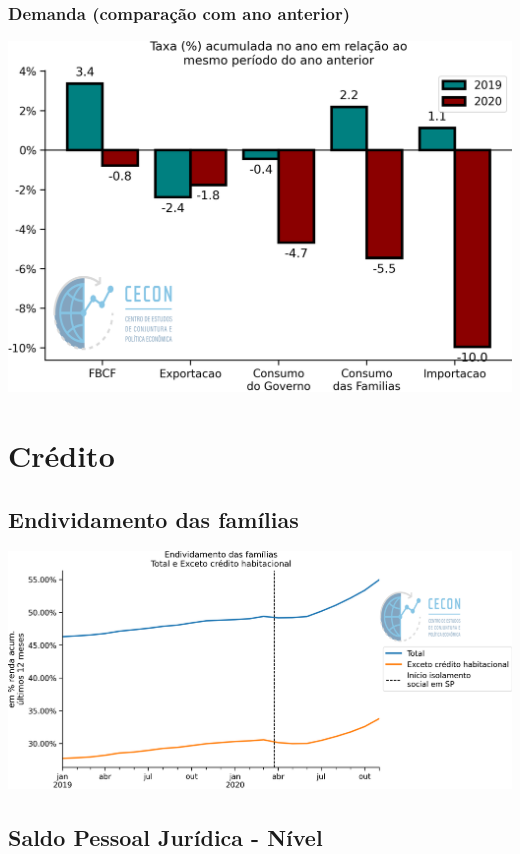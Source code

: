 \documentclass{SelfArx}
\begin{document}
\subsubsection*{Demanda (comparação com ano anterior)}
\label{sec:org7d4bccf}

\begin{center}
\includegraphics[width=.9\linewidth]{./figs/PIB/Demanda_Acum_Comparativo.png}
\end{center}

\section*{Crédito}
\label{sec:org9c53ea6}

\subsection*{Endividamento das famílias}
\label{sec:org50aa024}

\begin{center}
\includegraphics[width=.9\linewidth]{./figs/Credito/EndividamentoFamilias.png}
\end{center}


\subsection*{Saldo Pessoal Jurídica - Nível}
\label{sec:org92152ef}
\end{document}
